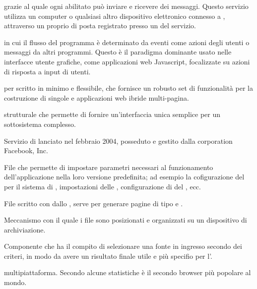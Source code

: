 {  grazie al quale ogni  abilitato può inviare e ricevere dei messaggi. Questo servizio utilizza un computer o qualsiasi altro dispositivo elettronico connesso a , attraverso un proprio  di posta registrato presso un  del servizio.}

{ in cui il flusso del programma è determinato da eventi come azioni degli utenti o messaggi da altri programmi. Questo è il paradigma dominante usato nelle interfacce utente grafiche, come applicazioni web Javascript, focalizzate su azioni di risposta a input di utenti.}


{ per  scritto in  minimo e flessibile, che fornisce un robusto set di funzionalità per la costruzione di singole e applicazioni web ibride multi-pagina.}




{ strutturale che permette di fornire un'interfaccia unica semplice per un sottosistema complesso.}


{Servizio di  lanciato nel febbraio 2004, posseduto e gestito dalla corporation Facebook, Inc.}

{File che permette di impostare parametri necessari al funzionamento dell'applicazione nella loro versione predefinita; ad esempio la cofigurazione del  per il sistema di , impostazioni delle , configurazione di  del , ecc.}

{File scritto con   dallo , serve per generare pagine di tipo  e .}

{Meccanismo con il quale i file sono posizionati e organizzati su un dispositivo di archiviazione.}

{Componente che ha il compito di selezionare una fonte in ingresso secondo dei criteri, in modo da avere un risultato finale utile e più specifio per l'.}

{  multipiattaforma. Secondo alcune statistiche è il secondo browser più popolare al mondo.}

